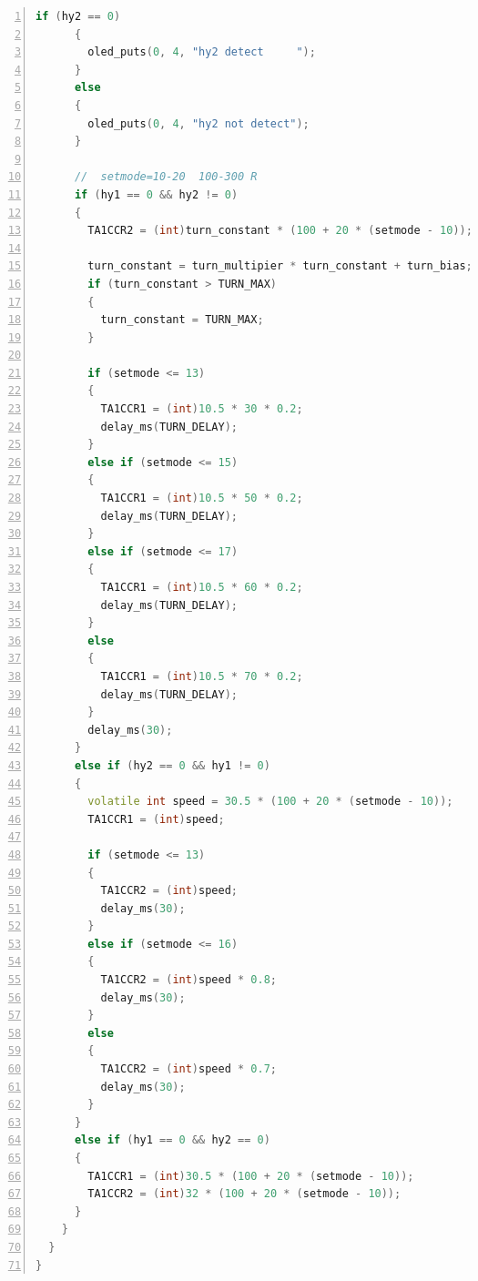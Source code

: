 \documentclass[a4paper,twoside,zihao=5,UTF8]{ctexart}
\begin{document}
\begin{spacing}{1.2}
\begin{lstlisting}[language=c++,numbers=left,style=CppStyle,caption=作业6,label={code:carctl}]
      if (hy2 == 0) 
      {
        oled_puts(0, 4, "hy2 detect     ");
      }
      else
      {
        oled_puts(0, 4, "hy2 not detect");
      }

      //  setmode=10-20  100-300 R
      if (hy1 == 0 && hy2 != 0) 
      {
        TA1CCR2 = (int)turn_constant * (100 + 20 * (setmode - 10)); 

        turn_constant = turn_multipier * turn_constant + turn_bias;
        if (turn_constant > TURN_MAX)
        {
          turn_constant = TURN_MAX;
        }

        if (setmode <= 13) 
        {
          TA1CCR1 = (int)10.5 * 30 * 0.2;
          delay_ms(TURN_DELAY);
        }
        else if (setmode <= 15)
        {
          TA1CCR1 = (int)10.5 * 50 * 0.2;
          delay_ms(TURN_DELAY);
        }
        else if (setmode <= 17)
        {
          TA1CCR1 = (int)10.5 * 60 * 0.2;
          delay_ms(TURN_DELAY);
        }
        else
        {
          TA1CCR1 = (int)10.5 * 70 * 0.2;
          delay_ms(TURN_DELAY);
        }
        delay_ms(30);
      }
      else if (hy2 == 0 && hy1 != 0)
      {
        volatile int speed = 30.5 * (100 + 20 * (setmode - 10));
        TA1CCR1 = (int)speed; 

        if (setmode <= 13)
        {
          TA1CCR2 = (int)speed;
          delay_ms(30);
        }
        else if (setmode <= 16)
        {
          TA1CCR2 = (int)speed * 0.8;
          delay_ms(30);
        }
        else
        {
          TA1CCR2 = (int)speed * 0.7;
          delay_ms(30);
        }
      }
      else if (hy1 == 0 && hy2 == 0)
      {
        TA1CCR1 = (int)30.5 * (100 + 20 * (setmode - 10));
        TA1CCR2 = (int)32 * (100 + 20 * (setmode - 10));
      }
    }
  }
}
\end{lstlisting}


\end{spacing}
\end{document}
